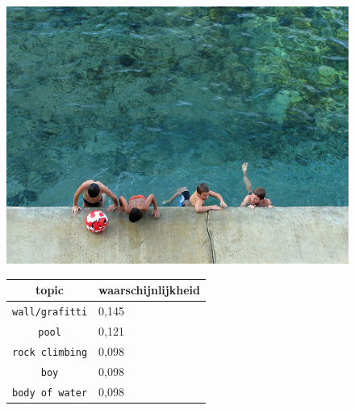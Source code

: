 \begin{figure}[h]
    \centering
    \begin{minipage}[t]{.5\linewidth}
    \centering
    \vspace{0pt}
    \includegraphics[width=\textwidth]{Images/LDA/3283626303.jpg}
    \end{minipage}\hfill
    \begin{minipage}[t]{.5\textwidth}
    \centering
    \vspace{0pt}
    \begin{tabularx}{\textwidth}{cl}
            topic                           & waarschijnlijkheid\\
            \hline
            \texttt{wall/grafitti} & 0,145\\
            \texttt{pool} & 0,121\\
            \texttt{rock climbing} & 0,098\\
            \texttt{boy} & 0,098\\
            \texttt{body of water} & 0,098\\
            \hline
        \end{tabularx}
    \end{minipage}
\end{figure}
